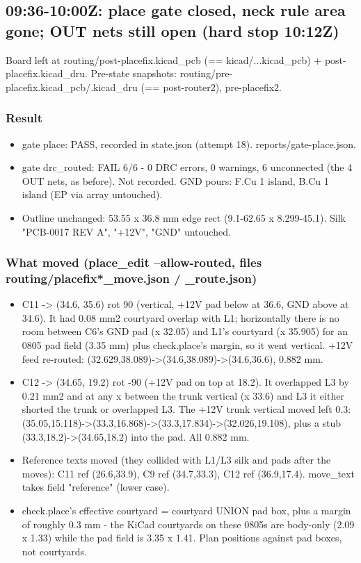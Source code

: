 \documentclass[11pt]{article}
\begin{document}
\subsection*{09:36-10:00Z: place gate closed, neck rule area gone; OUT nets still open (hard stop 10:12Z)}
Board left at routing/post-placefix.kicad\_pcb (== kicad/...kicad\_pcb) + post-placefix.kicad\_dru. Pre-state snapshots: routing/pre-placefix.kicad\_pcb/.kicad\_dru (== post-router2), pre-placefix2.

\subsubsection*{Result}
\begin{itemize}
\item gate place: PASS, recorded in state.json (attempt 18). reports/gate-place.json.
\item gate drc\_routed: FAIL 6/6 - 0 DRC errors, 0 warnings, 6 unconnected (the 4 OUT nets, as before).
Not recorded. GND pours: F.Cu 1 island, B.Cu 1 island (EP via array untouched).
\item Outline unchanged: 53.55 x 36.8 mm edge rect (9.1-62.65 x 8.299-45.1). Silk "PCB-0017 REV A",
"+12V", "GND" untouched.
\end{itemize}
\subsubsection*{What moved (place\_edit --allow-routed, files routing/placefix{*}\_move.json / \_route.json)}
\begin{itemize}
\item C11 -\textgreater{} (34.6, 35.6) rot 90 (vertical, +12V pad below at 36.6, GND above at 34.6). It had 0.08 mm2
courtyard overlap with L1; horizontally there is no room between C6's GND pad (x 32.05) and L1's
courtyard (x 35.905) for an 0805 pad field (3.35 mm) plus check.place's margin, so it went vertical.
+12V feed re-routed: (32.629,38.089)-\textgreater{}(34.6,38.089)-\textgreater{}(34.6,36.6), 0.882 mm.
\item C12 -\textgreater{} (34.65, 19.2) rot -90 (+12V pad on top at 18.2). It overlapped L3 by 0.21 mm2 and at any x
between the trunk vertical (x 33.6) and L3 it either shorted the trunk or overlapped L3. The +12V
trunk vertical moved left 0.3: (35.05,15.118)-\textgreater{}(33.3,16.868)-\textgreater{}(33.3,17.834)-\textgreater{}(32.026,19.108), plus a
stub (33.3,18.2)-\textgreater{}(34.65,18.2) into the pad. All 0.882 mm.
\item Reference texts moved (they collided with L1/L3 silk and pads after the moves): C11 ref (26.6,33.9),
C9 ref (34.7,33.3), C12 ref (36.9,17.4). move\_text takes field "reference" (lower case).
\item check.place's effective courtyard = courtyard UNION pad box, plus a margin of roughly 0.3 mm - the
KiCad courtyards on these 0805s are body-only (2.09 x 1.33) while the pad field is 3.35 x 1.41.
Plan positions against pad boxes, not courtyards.
\end{itemize}
\end{document}
